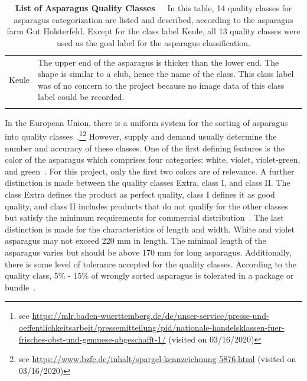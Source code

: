 \begin{table}[!ht]
{\begin{tabular}{l p{14cm}}
		\smallskip
		Keule & The upper end of the asparagus is thicker than the lower end. The shape                 is similar to a club, hence the name of the class. This class label was of no concern         to the project because no image data of this class label could be recorded. \\
		\\
		\hline
	\end{tabular}%
	}
	\caption[List of Asparagus Quality Classes]{\textbf{List of Asparagus Quality Classes}~~~In this table, 14 quality classes for asparagus categorization are listed and described, according to the asparagus farm Gut Holsterfeld. Except for the class label Keule, all 13 quality classes were used as the goal label for the asparagus classification.}
	\label{tab:AsparagusLabels}
\end{table}

In the European Union, there is a uniform system for the sorting of asparagus into quality classes~\citep{euspargelnorm,unspargelnorm}.\footnote{see \url{https://mlr.baden-wuerttemberg.de/de/unser-service/presse-und-oeffentlichkeitsarbeit/pressemitteilung/pid/nationale-handelsklassen-fuer-frisches-obst-und-gemuese-abgeschafft-1/} (visited on 03/16/2020)}\footnote{see \url{https://www.bzfe.de/inhalt/spargel-kennzeichnung-5876.html} (visited on 03/16/2020)} However, supply and demand usually determine the number and accuracy of these classes. One of the first defining features is the color of the asparagus which comprises four categories: white, violet, violet-green, and green~\citep{euspargelnorm}. For this project, only the first two colors are of relevance. A further distinction is made between the quality classes Extra, class I, and class II. The class Extra defines the product as perfect quality, class I defines it as good quality, and class II includes products that do not qualify for the other classes but satisfy the minimum requirements for commercial distribution~\citep{euspargelnorm}. The last distinction is made for the characteristics of length and width. White and violet asparagus may not exceed 220 mm in length. The minimal length of the asparagus varies but should be above 170 mm for long asparagus. Additionally, there is some level of tolerance accepted for the quality classes. According to the quality class, 5\% - 15\% of wrongly sorted asparagus is tolerated in a package or bundle~\citep{euspargelnorm}.


